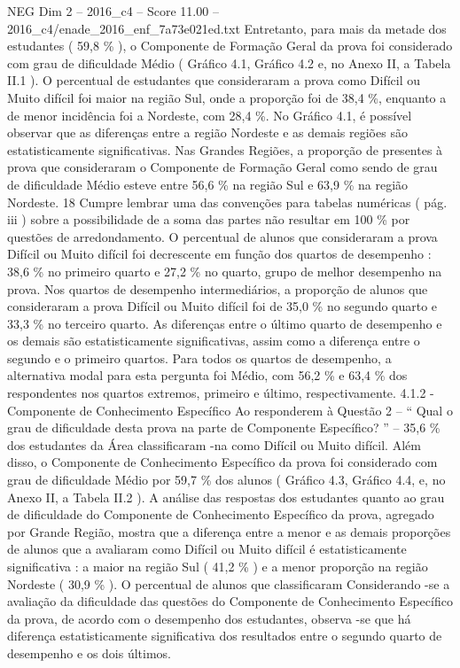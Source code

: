\begin{textsample}{NEG Dim 2 – 2016\_c4 – Score 11.00 – 2016\_c4/enade\_2016\_enf\_7a73e021ed.txt}
Entretanto, para mais da metade dos estudantes ( 59,8 \% ), o Componente de Formação Geral da prova foi considerado com grau de dificuldade Médio ( Gráfico 4.1, Gráfico 4.2 e, no Anexo II, a Tabela II.1 ).
O percentual de estudantes que consideraram a prova como Difícil ou Muito difícil foi maior na região Sul, onde a proporção foi de 38,4 \%, enquanto a de menor incidência foi a Nordeste, com 28,4 \%.
No Gráfico 4.1, é possível observar que as diferenças entre a região Nordeste e as demais regiões são estatisticamente significativas.
Nas Grandes Regiões, a proporção de presentes à prova que consideraram o Componente de Formação Geral como sendo de grau de dificuldade Médio esteve entre 56,6 \% na região Sul e 63,9 \% na região Nordeste. 18 Cumpre lembrar uma das convenções para tabelas numéricas ( pág. iii ) sobre a possibilidade de a soma das partes não resultar em 100 \% por questões de arredondamento.
O percentual de alunos que consideraram a prova Difícil ou Muito difícil foi decrescente em função dos quartos de desempenho : 38,6 \% no primeiro quarto e 27,2 \% no quarto, grupo de melhor desempenho na prova.
Nos quartos de desempenho intermediários, a proporção de alunos que consideraram a prova Difícil ou Muito difícil foi de 35,0 \% no segundo quarto e 33,3 \% no terceiro quarto.
As diferenças entre o último quarto de desempenho e os demais são estatisticamente significativas, assim como a diferença entre o segundo e o primeiro quartos.
Para todos os quartos de desempenho, a alternativa modal para esta pergunta foi Médio, com 56,2 \% e 63,4 \% dos respondentes nos quartos extremos, primeiro e último, respectivamente. 4.1.2 - Componente de Conhecimento Específico Ao responderem à Questão 2 – “ Qual o grau de dificuldade desta prova na parte de Componente Específico? ” – 35,6 \% dos estudantes da Área classificaram -na como Difícil ou Muito difícil.
Além disso, o Componente de Conhecimento Específico da prova foi considerado com grau de dificuldade Médio por 59,7 \% dos alunos ( Gráfico 4.3, Gráfico 4.4, e, no Anexo II, a Tabela II.2 ).
A análise das respostas dos estudantes quanto ao grau de dificuldade do Componente de Conhecimento Específico da prova, agregado por Grande Região, mostra que a diferença entre a menor e as demais proporções de alunos que a avaliaram como Difícil ou Muito difícil é estatisticamente significativa : a maior na região Sul ( 41,2 \% ) e a menor proporção na região Nordeste ( 30,9 \% ).
O percentual de alunos que classificaram Considerando -se a avaliação da dificuldade das questões do Componente de Conhecimento Específico da prova, de acordo com o desempenho dos estudantes, observa -se que há diferença estatisticamente significativa dos resultados entre o segundo quarto de desempenho e os dois últimos.

\end{textsample}
